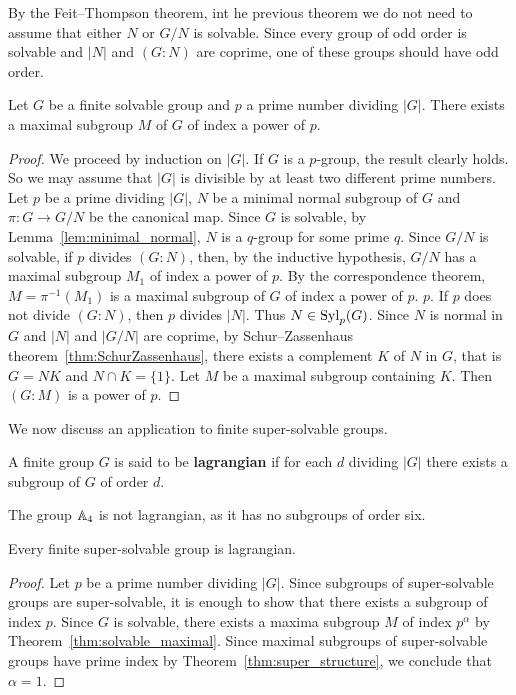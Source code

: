 By the Feit--Thompson theorem, int he previous theorem 
we do not need to assume that either $N$ or $G/N$ is solvable. Since every group of odd order is solvable 
and $|N|$ and $(G:N)$ are coprime, one of these groups should have odd order. 

\begin{theorem}
	\label{thm:solvable_maximal}
	Let $G$ be a finite solvable group and $p$ a prime number dividing $|G|$. There exists a maximal 
    subgroup $M$ of $G$ of index a power of $p$. 
\end{theorem}

\begin{proof}
	We proceed by induction on $|G|$. If $G$ is a $p$-group, the result clearly holds. So we may assume that $|G|$ is divisible by at least two different prime numbers. 
    Let $p$ be a prime dividing $|G|$, $N$ be a minimal normal subgroup of $G$ and 
    $\pi\colon G\to G/N$ be the canonical map. Since $G$ is solvable, by Lemma~\ref{lem:minimal_normal}, 
    $N$ is a $q$-group for some prime $q$. Since $G/N$ is solvable, if $p$ divides 
	$(G:N)$, then, by the inductive hypothesis, $G/N$ has a maximal subgroup 
 	$M_1$ of index a power of $p$. By the correspondence theorem, 
  $M=\pi^{-1}(M_1)$ is a maximal subgroup of $G$ of index a power of $p$. 
  $p$. If $p$ does not divide $(G:N)$, then $p$ divides $|N|$. Thus 
	$N\in\mathrm{Syl}_p(G)$. Since $N$ is normal in $G$ and $|N|$ and $|G/N|$ are coprime, by 
	Schur--Zassenhaus theorem~\ref{thm:SchurZassenhaus}, 
	there exists a complement $K$ of $N$ in $G$, that is $G=NK$ and $N\cap K=\{1\}$. Let 
	$M$ be a maximal subgroup containing $K$. Then $(G:M)$ is a power of $p$. 
\end{proof}

We now discuss an application to finite super-solvable groups. 

\begin{definition}
	A finite group $G$ is said to be \textbf{lagrangian} if for each $d$ dividing $|G|$ 
	there exists a subgroup of $G$ of order $d$.
\end{definition}

The group $\mathbb{A}_4$ is not lagrangian, as it has no subgroups of order six. 

\begin{theorem}
	Every finite super-solvable group is lagrangian. 
\end{theorem}

\begin{proof}
	Let $p$ be a prime number dividing $|G|$. Since subgroups of super-solvable groups are super-solvable, it is enough to 
    show that there exists a subgroup of index $p$. 
	Since $G$ is solvable, there exists a maxima subgroup $M$ of index 
	$p^{\alpha}$ by Theorem~\ref{thm:solvable_maximal}. Since maximal subgroups of super-solvable groups have prime index 
    by Theorem~\ref{thm:super_structure}, we conclude that $\alpha=1$.
\end{proof}

